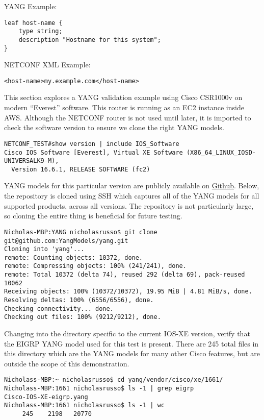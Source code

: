 YANG Example:

\begin{verbatim}
leaf host-name {
    type string;
    description "Hostname for this system";
}
\end{verbatim}

NETCONF XML Example:
\begin{verbatim}
<host-name>my.example.com</host-name>
\end{verbatim}

This section explores a YANG validation example using Cisco CSR1000v on modern
``Everest'' software. This router is running as an EC2 instance inside AWS\@.
Although the NETCONF router is not used until later, it is imported to check
the software version to ensure we clone the right YANG models.

\begin{verbatim}
NETCONF_TEST#show version | include IOS_Software
Cisco IOS Software [Everest], Virtual XE Software (X86_64_LINUX_IOSD-UNIVERSALK9-M),
  Version 16.6.1, RELEASE SOFTWARE (fc2)
\end{verbatim}

YANG models for this particular version are publicly available on
\href{https://github.com/YangModels/yang/}{Github}. Below, the repository is
cloned using SSH which captures all of the YANG models for all supported
products, across all versions. The repository is not particularly large, so
cloning the entire thing is beneficial for future testing.

\begin{verbatim}
Nicholas-MBP:YANG nicholasrusso$ git clone git@github.com:YangModels/yang.git
Cloning into 'yang'...
remote: Counting objects: 10372, done.
remote: Compressing objects: 100% (241/241), done.
remote: Total 10372 (delta 74), reused 292 (delta 69), pack-reused 10062
Receiving objects: 100% (10372/10372), 19.95 MiB | 4.81 MiB/s, done.
Resolving deltas: 100% (6556/6556), done.
Checking connectivity... done.
Checking out files: 100% (9212/9212), done.
\end{verbatim}

Changing into the directory specific to the current IOS-XE version, verify
that the EIGRP YANG model used for this test is present. There are 245 total
files in this directory which are the YANG models for many other Cisco
features, but are outside the scope of this demonstration.

\begin{verbatim}
Nicholass-MBP:~ nicholasrusso$ cd yang/vendor/cisco/xe/1661/
Nicholass-MBP:1661 nicholasrusso$ ls -1 | grep eigrp
Cisco-IOS-XE-eigrp.yang
Nicholass-MBP:1661 nicholasrusso$ ls -1 | wc
     245    2198   20770
\end{verbatim}

